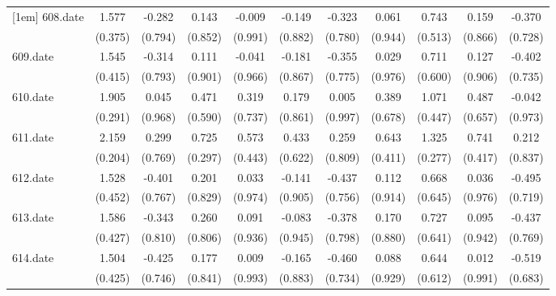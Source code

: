\begin{tabular}{l*{10}{c}}
[1em]
608.date    &       1.577&      -0.282&       0.143&      -0.009&      -0.149&      -0.323&       0.061&       0.743&       0.159&      -0.370\\
            &     (0.375)&     (0.794)&     (0.852)&     (0.991)&     (0.882)&     (0.780)&     (0.944)&     (0.513)&     (0.866)&     (0.728)\\
[1em]
609.date    &       1.545&      -0.314&       0.111&      -0.041&      -0.181&      -0.355&       0.029&       0.711&       0.127&      -0.402\\
            &     (0.415)&     (0.793)&     (0.901)&     (0.966)&     (0.867)&     (0.775)&     (0.976)&     (0.600)&     (0.906)&     (0.735)\\
[1em]
610.date    &       1.905&       0.045&       0.471&       0.319&       0.179&       0.005&       0.389&       1.071&       0.487&      -0.042\\
            &     (0.291)&     (0.968)&     (0.590)&     (0.737)&     (0.861)&     (0.997)&     (0.678)&     (0.447)&     (0.657)&     (0.973)\\
[1em]
611.date    &       2.159&       0.299&       0.725&       0.573&       0.433&       0.259&       0.643&       1.325&       0.741&       0.212\\
            &     (0.204)&     (0.769)&     (0.297)&     (0.443)&     (0.622)&     (0.809)&     (0.411)&     (0.277)&     (0.417)&     (0.837)\\
[1em]
612.date    &       1.528&      -0.401&       0.201&       0.033&      -0.141&      -0.437&       0.112&       0.668&       0.036&      -0.495\\
            &     (0.452)&     (0.767)&     (0.829)&     (0.974)&     (0.905)&     (0.756)&     (0.914)&     (0.645)&     (0.976)&     (0.719)\\
[1em]
613.date    &       1.586&      -0.343&       0.260&       0.091&      -0.083&      -0.378&       0.170&       0.727&       0.095&      -0.437\\
            &     (0.427)&     (0.810)&     (0.806)&     (0.936)&     (0.945)&     (0.798)&     (0.880)&     (0.641)&     (0.942)&     (0.769)\\
[1em]
614.date    &       1.504&      -0.425&       0.177&       0.009&      -0.165&      -0.460&       0.088&       0.644&       0.012&      -0.519\\
            &     (0.425)&     (0.746)&     (0.841)&     (0.993)&     (0.883)&     (0.734)&     (0.929)&     (0.612)&     (0.991)&     (0.683)\\

\end{tabular}
